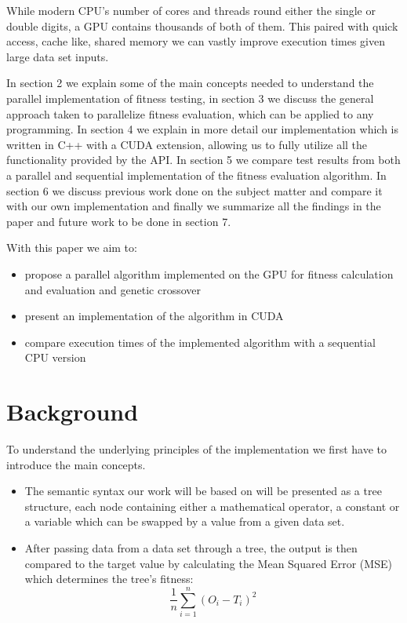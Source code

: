 \documentclass[runningheads]{llncs}
\begin{document}
While modern CPU's number of cores and threads round either the single or double digits, a GPU contains thousands of both of them. This paired with quick access, cache like, shared memory we can vastly improve execution times given large data set inputs.

In section 2 we explain some of the main concepts needed to understand the parallel implementation of fitness testing, in section 3 we discuss the general approach taken to parallelize fitness evaluation, which can be applied to any programming. In section 4 we explain in more detail our implementation which is written in C++ with a CUDA extension, allowing us to fully utilize all the functionality provided by the API. In section 5 we compare test results from both a parallel and sequential implementation of the fitness evaluation algorithm. In section 6 we discuss previous work done on the subject matter and compare it with our own implementation and finally we summarize all the findings in the paper and future work to be done in section 7.

With this paper we aim to:
\begin{itemize}
	\item propose a parallel algorithm implemented on the GPU for fitness calculation and evaluation and genetic crossover
	\item present an implementation of the algorithm in CUDA
	\item compare execution times of the implemented algorithm with a sequential CPU version
\end{itemize}


\section{Background}
To understand the underlying principles of the implementation we first have to introduce the main concepts.
\begin{itemize}
	\item The semantic syntax our work will be based on will be presented as a tree structure, each node containing either a mathematical operator, a constant or a variable which can be swapped by a value from a given data set.
	\item After passing data from a data set through a tree, the output is then compared to the target value by calculating the Mean Squared Error (MSE) which determines the tree's fitness: $$\frac{1}{n}\sum_{i=1}^{n} (O_i - T_i)^{2}$$
\end{itemize}
\end{document}
